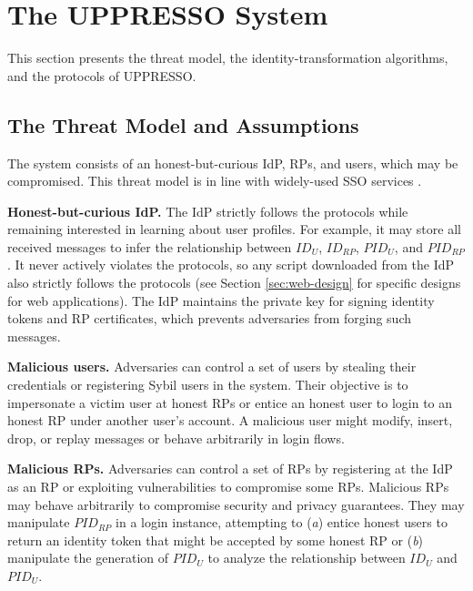 \section{The UPPRESSO System}
\label{sec:UPPRESSO}

This section presents the threat model, the identity-transformation algorithms, and the protocols of UPPRESSO.

\subsection{The Threat Model and Assumptions}
\label{subsec:threatmodel}
The system consists of an honest-but-curious IdP, RPs, and users, which may be compromised. %
This threat model is in line with widely-used SSO services \cite{OpenIDConnect,rfc6749, SAML, SAMLIdentifier, NIST2017draft}.

\noindent \textbf{Honest-but-curious IdP.} The IdP strictly follows the protocols while remaining interested in learning about user profiles.
For example, it may store all received messages to infer the relationship between $ID_U$, $ID_{RP}$, $PID_{U}$, and $PID_{RP}$.
It never actively violates the protocols, so any script downloaded from the IdP also strictly follows the protocols (see Section \ref{sec:web-design} for specific designs for web applications). The IdP maintains the private key for signing identity tokens and RP certificates, %
which prevents adversaries from forging such messages.

\noindent \textbf{Malicious users.} Adversaries can control a set of users by stealing their credentials or registering Sybil users in the system. Their objective is to impersonate a victim user at honest RPs or entice an honest user to login to an honest RP under another user's account.
A malicious user might modify, insert, drop, or replay messages or behave arbitrarily in login flows.

\noindent \textbf{Malicious RPs.}
Adversaries can control a set of RPs by registering at the IdP as an RP or exploiting vulnerabilities to compromise some RPs. Malicious RPs may behave arbitrarily to compromise security and privacy guarantees.
They may manipulate $PID_{RP}$ in a login instance, attempting to (\emph{a}) entice honest users to return an identity token that might be accepted by some honest RP or (\emph{b}) manipulate the generation of $PID_U$ to analyze the relationship between $ID_U$ and $PID_U$.


